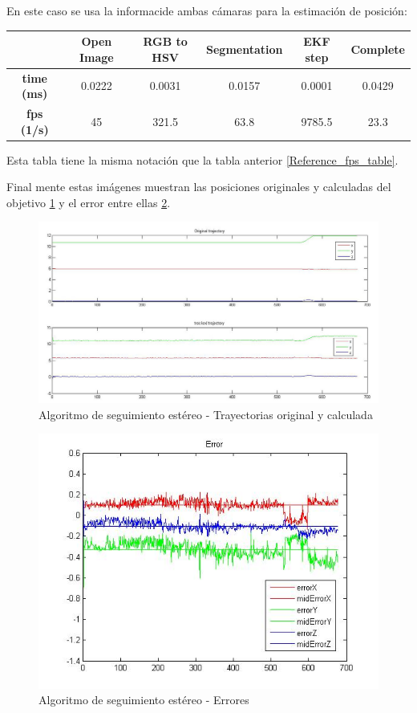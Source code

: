 	En este caso se usa la informaci\on de ambas c\'amaras para la estimaci\'on de posici\'on: \\
		
	{                
	\centering
		\begin{tabular}{|c|c|c|c|c||c|}
		\hline  					&  Open Image	&  RGB to HSV 	& Segmentation 	& EKF step  & Complete \\ 
		\hline  \textbf{time (ms)}	&	0.0222		& 	0.0031 		&  	0.0157		&  	0.0001 	&  0.0429		\\ 
		\hline  \textbf{fps (1/s)}	& 	45 			& 	321.5 		& 	63.8 		& 9785.5	&  23.3		\\ 
		\hline 
		\end{tabular} 
	}
	\newline
	
	Esta tabla tiene la misma notaci\'on que la tabla anterior \ref{Reference_fps_table}.
	
	Final mente estas im\'agenes muestran las posiciones originales y calculadas del objetivo \ref{fig:trajectories_stereo_PC} y el error entre ellas \ref{fig:errors_stereo_PC}.
	
	\begin{figure}[hp]
		\centering
		\includegraphics[width=\linewidth]{../Images/c4/trajs_stereo}
		\caption{Algoritmo de seguimiento est\'ereo - Trayectorias original y calculada}
		\label{fig:trajectories_stereo_PC}
	\end{figure}
	
	\begin{figure}[htp]
		\centering
		\includegraphics[width=0.7\linewidth]{../Images/c4/errors_stereo}
		\caption{Algoritmo de seguimiento est\'ereo - Errores}
		\label{fig:errors_stereo_PC}
	\end{figure}	
	
